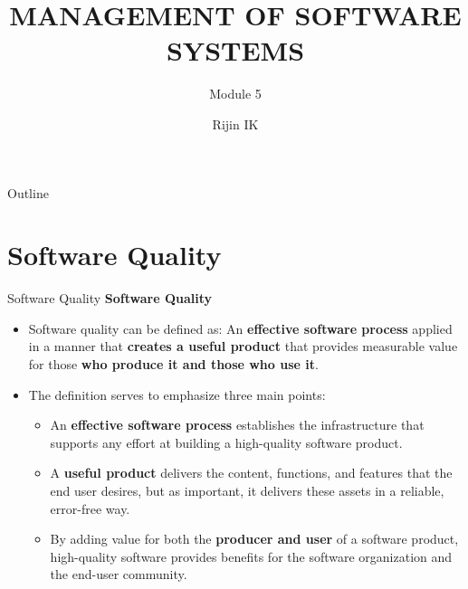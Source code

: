 \documentclass{beamer}
\title[CST 309 M5]{MANAGEMENT OF SOFTWARE SYSTEMS}
\subtitle{Module 5}
\author{Rijin IK}
\institute[VJEC]{Assistant Professor\\Department of Computer Science and Engineering\\Vimal Jyothi Engineering College\\Chemperi}
\begin{document}
	\begin{frame}
		\titlepage
	\end{frame}
   \begin{frame}{Outline}
   \tableofcontents
   \end{frame}
\section{Software Quality}
\begin{frame}{Software Quality}
\textbf{Software Quality}
\begin{itemize}
	\item Software quality can be defined as: An \textbf{effective software process} applied in a manner that \textbf{creates a useful product }that provides measurable value for those \textbf{who produce it and those who use it}. 
	\item The definition serves to emphasize three main points:
	\begin{itemize}
		\item An \textbf{effective software process} establishes the infrastructure that supports any effort at building a high-quality software product. 
		\item A \textbf{useful product} delivers the content, functions, and features that the end user desires, but as 
		important, it delivers these assets in a reliable, error-free way. 
		\item By adding value for both the \textbf{producer and user }of a software product, high-quality software provides 
		benefits for the software organization and the end-user community. 
	\end{itemize}
	
	\end{itemize}
\end{frame}
\end{document}
